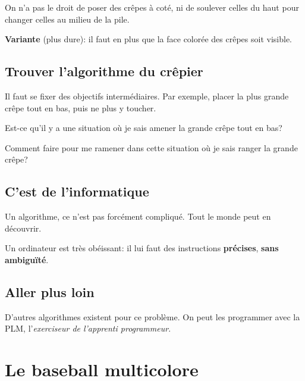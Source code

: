\documentclass[a7paper,pagesize,DIV=14,10pt]{scrbook}
\begin{document}
\medskip%
On n'a pas le droit de poser des crêpes à coté, ni de soulever celles
du haut pour changer celles au milieu de la pile.

\bigskip%
\textbf{Variante} (plus dure): il faut en plus que la face colorée des
crêpes soit visible.

\newpage
\subsection*{Trouver l'algorithme du crêpier}
\vspace{-.5\baselineskip}

Il faut se fixer des objectifs intermédiaires. Par exemple, placer la
plus grande crêpe tout en bas, puis ne plus y toucher.

\smallskip
Est-ce qu'il y a une situation où je sais amener la grande crêpe tout en bas?

\smallskip
Comment faire pour me ramener dans cette situation où je sais ranger la grande crêpe?

\vspace{-.6\baselineskip}
\subsection*{C'est de l'informatique}
\vspace{-.5\baselineskip}

Un algorithme, ce n'est pas forcément compliqué. Tout le monde peut en découvrir.

\smallskip
Un ordinateur est très obéissant: il lui faut des instructions
\textbf{précises}, \textbf{sans ambiguïté}.

\vspace{-.6\baselineskip}
\subsection*{Aller plus loin}
\vspace{-.5\baselineskip}
D'autres algorithmes existent pour ce problème. On peut les programmer
avec la PLM, l'\textit{exerciseur de l'apprenti programmeur}.%

\newpage
\section*{Le baseball multicolore}

\end{document}
